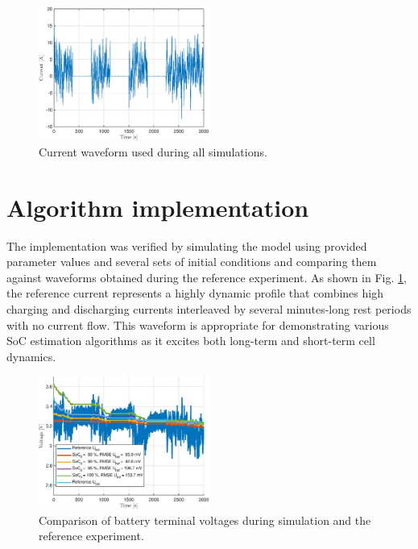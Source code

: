 \begin{figure}
    \centering
    \includegraphics[width=0.5\textwidth]{figures/7/validation-I.eps}
    \caption{Current waveform used during all simulations.}
    \label{fig:7-validation-I}
\end{figure}

\section{Algorithm implementation}

The implementation was verified by simulating the model using provided parameter values and several sets of initial conditions and comparing them against waveforms obtained during the reference experiment. As shown in Fig. \ref{fig:7-validation-I}, the reference current represents a highly dynamic profile that combines high charging and discharging currents interleaved by several minutes-long rest periods with no current flow. This waveform is appropriate for demonstrating various SoC estimation algorithms as it excites both long-term and short-term cell dynamics.



\begin{figure}
    \centering
    \includegraphics[width=0.5\textwidth]{figures/7/validation-Ubat.eps}
    \caption{Comparison of battery terminal voltages during simulation and the reference experiment.}
    \label{fig:7-validation-Ubat}
\end{figure}

